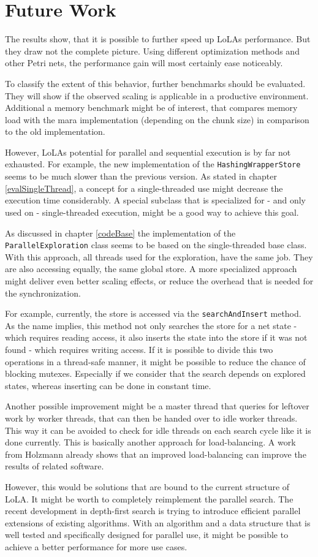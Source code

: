 \chapter{Future Work}
The results show, that it is possible to further speed up LoLAs performance. But they draw not the complete picture. Using different optimization methods and other Petri nets, the performance gain will most certainly ease noticeably.

To classify the extent of this behavior, further benchmarks should be evaluated. They will show if the observed scaling is applicable in a productive environment. Additional a memory benchmark might be of interest, that compares memory load with the mara implementation (depending on the chunk size) in comparison to the old implementation.

However, LoLAs potential for parallel and sequential execution is by far not exhausted. For example, the new implementation of the \texttt{HashingWrapperStore} seems to be much slower than the previous version. As stated in chapter \ref{evalSingleThread}, a concept for a single-threaded use might decrease the execution time considerably. A special subclass that is specialized for - and only used on - single-threaded execution, might be a good way to achieve this goal.

As discussed in chapter \ref{codeBase} the implementation of the \texttt{ParallelExploration} class seems to be based on the single-threaded base class. With this approach, all threads used for the exploration, have the same job. They are also accessing equally, the same global store. A more specialized approach might deliver even better scaling effects, or reduce the overhead that is needed for the synchronization.

For example, currently, the store is accessed via the \texttt{searchAndInsert} method. As the name implies, this method not only searches the store for a net state - which requires reading access, it also inserts the state into the store if it was not found - which requires writing access. If it is possible to divide this two operations in a thread-safe manner, it might be possible to reduce the chance of blocking mutexes. Especially if we consider that the search depends on explored states, whereas inserting can be done in constant time.

Another possible improvement might be a master thread that queries for leftover work by worker threads, that can then be handed over to idle worker threads. This way it can be avoided to check for idle threads on each search cycle like it is done currently. This is basically another approach for load-balancing. A work from Holzmann already shows that an improved load-balancing can improve the results of related software\cite{holzmann2008stack}.

However, this would be solutions that are bound to the current structure of LoLA. It might be worth to completely reimplement the parallel search. The recent development in depth-first search is trying to introduce efficient parallel extensions of existing algorithms\cite{bloemen2016multi}. With an algorithm and a data structure that is well tested and specifically designed for parallel use, it might be possible to achieve a better performance for more use cases.